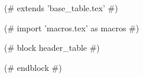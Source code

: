 (# extends 'base_table.tex' #)

(# import 'macros.tex' as macros #)


(# block header_table #)


(# endblock #)